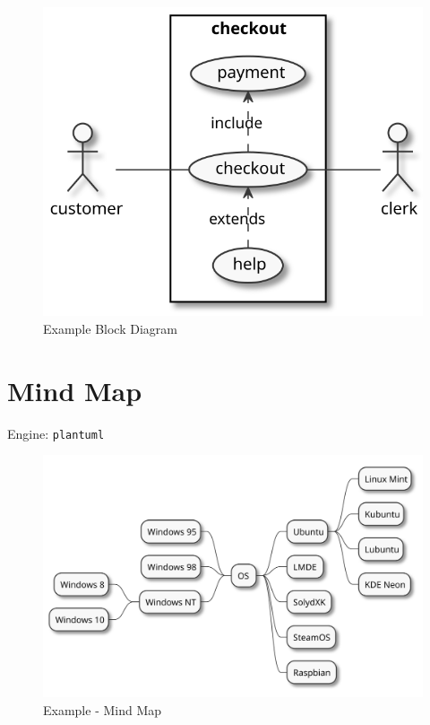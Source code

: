 \documentclass[
  12pt,
  a4paper,
  12pt,
  oneside,
  openany]{book}
\begin{document}
\begin{figure}

{\centering \includegraphics{generated/diagrams-examples-plantuml-usecase-Rmd} 

}

\caption{Example Block Diagram}\label{fig:examples-pumlUsecase}
\end{figure}

\newpage

\hypertarget{kroki-pumlMindmap}{%
\section{Mind Map}\label{kroki-pumlMindmap}}

Engine: \texttt{plantuml}

\begin{figure}

{\centering \includegraphics{generated/diagrams-examples-plantuml-mindmap-Rmd} 

}

\caption{Example - Mind Map}\label{fig:examples-pumlMindmap}
\end{figure}
\end{document}
